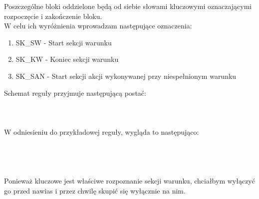Poszczególne bloki oddzielone będą od siebie słowami kluczowymi oznaczającymi rozpoczęcie i zakończenie bloku. \\

W celu ich wyróżnienia wprowadzam następujące oznaczenia:
\begin{enumerate}
	\item SK\_SW - Start sekcji warunku
	\item SK\_KW - Koniec sekcji warunku
	\item SK\_SAN - Start sekcji akcji wykonywanej przy niespełnionym warunku
\end{enumerate}
Schemat reguły przyjmuje następującą postać:
\\ \\
\\ \\

W odniesieniu do przykładowej reguły, wygląda to następująco:
\\ \\
\\ \\

\paragraph{}
Ponieważ kluczowe jest właściwe rozpoznanie sekcji warunku, chciałbym wyłączyć go przed nawias i przez chwilę skupić się wyłącznie na nim. 
\\ \\
\\ \\


